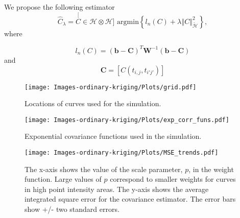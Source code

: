 \documentclass{beamer}
\renewcommand{\H}{\mathcal{H}}
\begin{document}
\begin{frame}
We propose the following estimator
\[
\widehat{C}_{\lambda}=\stackrel[C \in \H\otimes \H]{}{\text{ argmin}} \left\{ l_{n}(C)+\lambda\left\Vert C\right\Vert _{\breve{\H}}^{2} \right\},
\]
 where

\begin{equation}
l_{n}(C)= (\mathbf{b} - \mathbf{C})^T\mathbf{W}^{-1}(\mathbf{b} - \mathbf{C})
\label{eq:weighted loss function}
\end{equation}
and 
\[
\mathbf{C} = [C(t_{i,j}, t_{i'j'})]
\]
\end{frame}


\begin{frame}[t]{}
	\begin{figure}[h]
		\begin{center}
			\texttt{[image: Images-ordinary-kriging/Plots/grid.pdf]} 
		\end{center}
		\caption{Locations of curves used for the simulation.} \label{fig:grid3} 
	\end{figure}
\end{frame}

\begin{frame}[t]{}
	\begin{figure}[h]
		\begin{center}
			\texttt{[image: Images-ordinary-kriging/Plots/exp\_corr\_funs.pdf]} 
		\end{center}
		\caption{Exponential covariance functions used in the simulation.} \label{fig:exp_corr_funs} 
	\end{figure}
\end{frame}

\begin{frame}[t]{}
	\begin{figure}[h]
		\begin{center}
			\texttt{[image: Images-ordinary-kriging/Plots/MSE\_trends.pdf]} 
		\end{center}
		\caption{The x-axis shows the value of the scale parameter, $p$, in the weight function. Large values of $p$ correspond to smaller weights for curves in high point intensity areas. The y-axis shows the average integrated square error for the covariance estimator. The error bars show +/- two standard errors.} \label{fig:MSE_trends} 
	\end{figure}
\end{frame}
\end{document}

